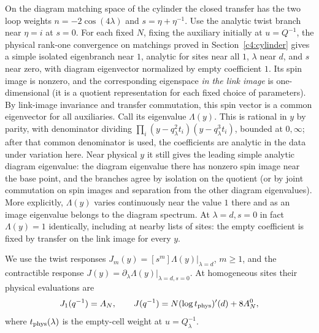 On the diagram matching space of the cylinder the closed transfer has the two loop weights \(n=-2\cos(4\lambda)\) and \(s=\eta+\eta^{-1}\). Use the analytic twist branch near \(\eta=i\) at \(s=0\). For each fixed \(N\), fixing the auxiliary initially at \(u=Q^{-1}\), the physical rank-one convergence on matchings proved in Section~\ref{c4:cylinder} gives a simple isolated eigenbranch near \(1\), analytic for sites near all \(1\), \(\lambda\) near \(d\), and \(s\) near zero, with diagram eigenvector normalized by empty coefficient \(1\). Its spin image is nonzero, and the corresponding eigenspace \emph{in the link image} is one-dimensional (it is a quotient representation for each fixed choice of parameters). By link-image invariance and transfer commutation, this spin vector is a common eigenvector for all auxiliaries. Call its eigenvalue \(\Lambda(y)\). This is rational in \(y\) by parity, with denominator dividing \(\prod_i(y-q_\lambda^2t_i)(y-q_\lambda^3t_i)\), bounded at \(0,\infty\); after that common denominator is used, the coefficients are analytic in the data under variation here. Near physical \(y\) it still gives the leading simple analytic diagram eigenvalue: the diagram eigenvalue there has nonzero spin image near the base point, and the branches agree by isolation on the quotient (or by joint commutation on spin images and separation from the other diagram eigenvalues). More explicitly, \(\Lambda(y)\) varies continuously near the value \(1\) there and as an image eigenvalue belongs to the diagram spectrum. At \(\lambda=d,s=0\) in fact \(\Lambda(y)=1\) identically, including at nearby lists of sites: the empty coefficient is fixed by transfer on the link image for every \(y\).

We use the twist responses
\(J_m(y)=[s^m]\Lambda(y)|_{\lambda=d}\), \(m\ge1\), and the
contractible response
\(J(y)=\partial_\lambda\Lambda(y)|_{\lambda=d,s=0}\).
At homogeneous sites their physical evaluations are
\[
 J_1(q^{-1})=A_N,\qquad
 J(q^{-1})=N(\log t_{\rm phys})'(d)+8A_N^0,
\]
where \(t_{\rm phys}(\lambda)\) is the empty-cell weight at
\(u=Q_\lambda^{-1}\).

